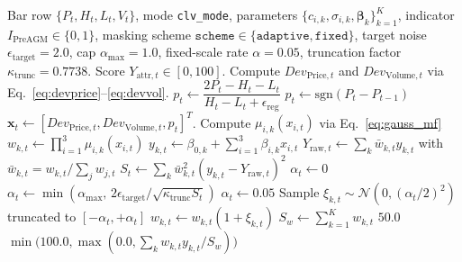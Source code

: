 \documentclass[pdflatex,sn-mathphys-num]{sn-jnl}
\theoremstyle{thmstyleone}
\theoremstyle{thmstyletwo}
\theoremstyle{thmstylethree}
\begin{document}
\begin{algorithm}[htbp]
\caption{TSK inference with CLV directional mode and dispersion-adaptive Pre-AGM masking}\label{alg:tsk_eval}
\begin{algorithmic}[1]
\Require Bar row $\{P_t,H_t,L_t,V_t\}$, mode \texttt{clv\_mode}, parameters $\{c_{i,k},\sigma_{i,k},\boldsymbol{\beta}_k\}_{k=1}^K$, indicator $I_{\mathrm{PreAGM}} \in \{0,1\}$, masking scheme $\texttt{scheme} \in \{\texttt{adaptive},\texttt{fixed}\}$, target noise $\epsilon_{\mathrm{target}} = 2.0$, cap $\alpha_{\max} = 1.0$, fixed-scale rate $\alpha = 0.05$, truncation factor $\kappa_{\mathrm{trunc}} = 0.7738$.
\Ensure Score $Y_{\mathrm{attr},t} \in [0,100]$.
\State Compute $Dev_{\mathrm{Price},t}$ and $Dev_{\mathrm{Volume},t}$ via Eq.~\eqref{eq:devprice}--\eqref{eq:devvol}.
    \State $p_t \leftarrow \dfrac{2 P_t - H_t - L_t}{H_t - L_t + \epsilon_{\mathrm{reg}}}$
\Else {}
    \State $p_t \leftarrow \mathrm{sgn}(P_t - P_{t-1})$
\EndIf
\State $\mathbf{x}_t \leftarrow [Dev_{\mathrm{Price},t}, Dev_{\mathrm{Volume},t}, p_t]^T$.
    \State Compute $\mu_{i,k}(x_{i,t})$ via Eq.~\eqref{eq:gauss_mf}
    \State $w_{k,t} \leftarrow \prod_{i=1}^{3} \mu_{i,k}(x_{i,t})$
    \State $y_{k,t} \leftarrow \beta_{0,k} + \sum_{i=1}^3 \beta_{i,k} x_{i,t}$
\EndFor
\State $Y_{\mathrm{raw},t} \leftarrow \sum_k \bar{w}_{k,t} y_{k,t}$ with $\bar{w}_{k,t} = w_{k,t}/\sum_j w_{j,t}$
        \State $S_t \leftarrow \sum_k \bar{w}_{k,t}^2 (y_{k,t} - Y_{\mathrm{raw},t})^2$ 
         
            \State $\alpha_t \leftarrow 0$
        \Else
            \State $\alpha_t \leftarrow \min(\alpha_{\max},\, 2\epsilon_{\mathrm{target}}/\sqrt{\kappa_{\mathrm{trunc}} S_t})$ 
        \EndIf
    \Else {}
        \State $\alpha_t \leftarrow 0.05$
    \EndIf
        \State Sample $\xi_{k,t} \sim \mathcal{N}\left(0, (\alpha_t/2)^2\right)$ truncated to $[-\alpha_t, +\alpha_t]$
        \State $w_{k,t} \leftarrow w_{k,t} (1 + \xi_{k,t})$
    \EndFor
\EndIf
\State $S_w \leftarrow \sum_{k=1}^{K} w_{k,t}$
    \State \Return $50.0$
\EndIf
\State \Return $\min\bigl(100.0, \max(0.0, \sum_k w_{k,t} y_{k,t} / S_w)\bigr)$
\end{algorithmic}
\end{algorithm}
\end{document}
